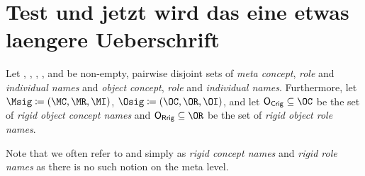 
\chapter{Test und jetzt wird das eine etwas laengere Ueberschrift}

\label{cha:context-dls}

\begin{definition}
  Let \MC, \MR, \MI, \OC, \OR and \OI be non-empty, pairwise disjoint sets of \emph{meta concept}, \emph{role} and
  \emph{individual names} and\emph{ object concept}, \emph{role} and \emph{individual
    names}. Furthermore, let $\Msig \coloneqq (\MC,\MR,\MI)$,  $\Osig \coloneqq (\OC,\OR,\OI)$, and
  let $\OCR\subseteq\OC$ be the set of \emph{rigid object concept names} and $\ORR\subseteq\OR$ be the set of \emph{rigid object role names}.
\end{definition}

Note that we often refer to \OCR and \ORR simply as \emph{rigid concept names} and \emph{rigid role
  names} as there is no such notion on the meta level.



